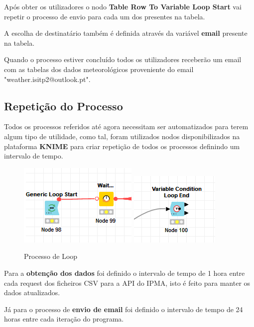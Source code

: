 Após obter os utilizadores o nodo \textbf{Table Row To Variable Loop Start} vai repetir o processo de envio para cada um dos presentes na tabela.

A escolha de destinatário também é definida através da variável \textbf{email} presente na tabela.

Quando o processo estiver concluído todos os utilizadores receberão um email com as tabelas dos dados
meteorológicos proveniente do email "weather.isitp2\-@outlook.pt".

\newpage
\subsection*{Repetição do Processo}

Todos os processos referidos até agora necessitam ser automatizados para terem algum tipo de utilidade,
como tal, foram utilizados nodos disponibilizados na plata\-forma \textbf{KNIME} para criar repetição 
de todos os processos definindo um intervalo de tempo.

\begin{figure}[H]
    \centering
    \includegraphics[]{imagens/Loop.png}
    \includegraphics[]{imagens/LoopEND.png}
    \caption{Processo de Loop}
\end{figure}


Para a \textbf{obtenção dos dados} foi definido o intervalo de tempo de 1 hora entre cada request dos ficheiros CSV para a API do IPMA, isto é feito para manter os dados atualizados.

Já para o processo de \textbf{envio de email} foi definido o intervalo de tempo de 24 horas entre cada iteração do programa.





